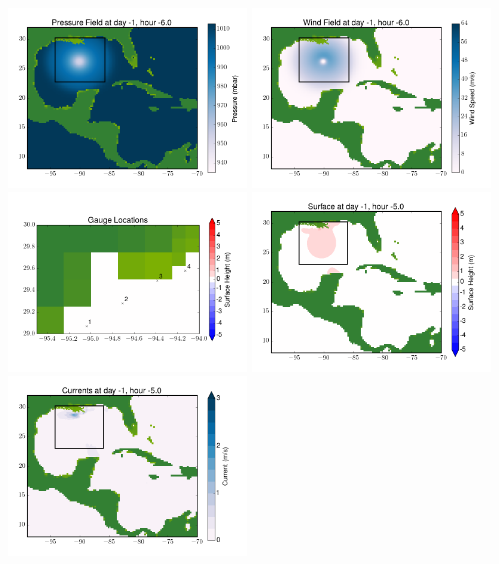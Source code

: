 \documentclass[11pt]{article}
\begin{document}
\includegraphics[width=0.475\textwidth]{frame0042fig8.png}
\vskip 10pt 
\includegraphics[width=0.475\textwidth]{frame0042fig9.png}
\includegraphics[width=0.475\textwidth]{frame0042fig10.png}
\vskip 10pt 
\includegraphics[width=0.475\textwidth]{frame0043fig1.png}
\includegraphics[width=0.475\textwidth]{frame0043fig2.png}
\end{document}
